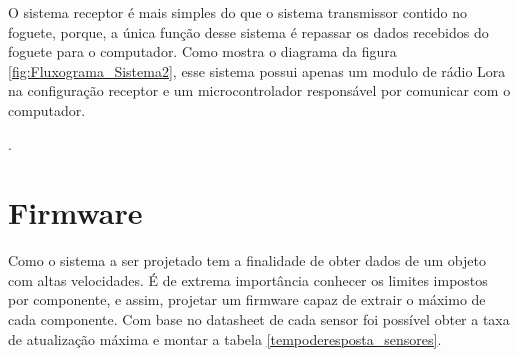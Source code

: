 O sistema receptor é mais simples do que o sistema transmissor contido no foguete, porque, a única função desse sistema é repassar os dados recebidos do foguete para o computador. Como mostra o diagrama da figura \ref{fig:Fluxograma_Sistema2}, esse sistema possui apenas um modulo de rádio Lora na configuração receptor e um microcontrolador responsável por comunicar com o computador.





 .
 

 
 

\section{Firmware} 






Como o sistema a ser projetado tem a finalidade de obter dados de um objeto com altas velocidades. É de extrema importância conhecer os limites impostos por  componente, e assim, projetar um firmware capaz de extrair o máximo de cada componente. Com base no datasheet de cada sensor foi possível obter a taxa de atualização máxima e montar a tabela \ref{tempoderesposta_sensores}. 





